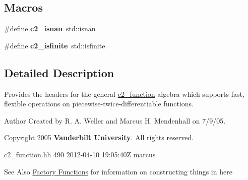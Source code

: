 \subsection*{Macros}
\begin{DoxyCompactItemize}
\item 
\hypertarget{c2__function_8hh_a14afbcf351b849f9d6c93270e1209145}{\#define {\bfseries c2\-\_\-isnan}~std\-::isnan}\label{c2__function_8hh_a14afbcf351b849f9d6c93270e1209145}

\item 
\hypertarget{c2__function_8hh_a87bfb19e93b8b5a8d6f4467823e49358}{\#define {\bfseries c2\-\_\-isfinite}~std\-::isfinite}\label{c2__function_8hh_a87bfb19e93b8b5a8d6f4467823e49358}

\end{DoxyCompactItemize}


\subsection{Detailed Description}
Provides the headers for the general \hyperlink{classc2__function}{c2\-\_\-function} algebra which supports fast, flexible operations on piecewise-\/twice-\/differentiable functions. \begin{DoxyAuthor}{Author}
Created by R. A. Weller and Marcus H. Mendenhall on 7/9/05. 

Copyright 2005 {\bfseries Vanderbilt University}. All rights reserved. \begin{DoxyVerb}   \version c2_function.hh 490 2012-04-10 19:05:40Z marcus 
\end{DoxyVerb}
 
\end{DoxyAuthor}
\begin{DoxySeeAlso}{See Also}
\hyperlink{classc2__factory}{Factory Functions} for information on constructing things in here 
\end{DoxySeeAlso}
